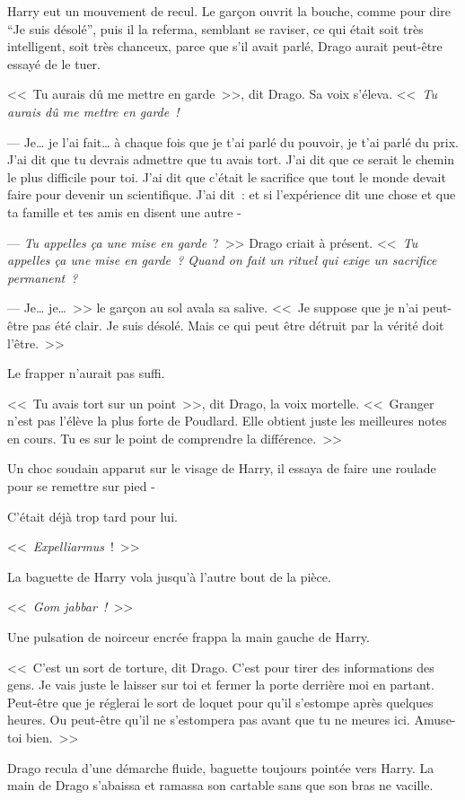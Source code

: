 Harry eut un mouvement de recul. Le garçon ouvrit la bouche, comme pour dire “Je suis désolé”, puis il la referma, semblant se raviser, ce qui était soit très intelligent, soit très chanceux, parce que s'il avait parlé, Drago aurait peut-être essayé de le tuer.

<<~Tu aurais dû me mettre en garde~>>, dit Drago. Sa voix s'éleva. <<~\emph{Tu aurais dû me mettre en garde~!}

--- Je… je l'ai fait… à chaque fois que je t'ai parlé du pouvoir, je t'ai parlé du prix. J'ai dit que tu devrais admettre que tu avais tort. J'ai dit que ce serait le chemin le plus difficile pour toi. J'ai dit que c'était le sacrifice que tout le monde devait faire pour devenir un scientifique. J'ai dit~: et si l'expérience dit une chose et que ta famille et tes amis en disent une autre -

--- \emph{Tu appelles ça une mise en garde}~?~>> Drago criait à présent. <<~\emph{Tu appelles ça une mise en garde~? Quand on fait un rituel qui exige un sacrifice permanent~?}

--- Je… je…~>> le garçon au sol avala sa salive. <<~Je suppose que je n'ai peut-être pas été clair. Je suis désolé. Mais ce qui peut être détruit par la vérité doit l'être.~>>

Le frapper n'aurait pas suffi.

<<~Tu avais tort sur un point~>>, dit Drago, la voix mortelle. <<~Granger n'est pas l'élève la plus forte de Poudlard. Elle obtient juste les meilleures notes en cours. Tu es sur le point de comprendre la différence.~>>

Un choc soudain apparut sur le visage de Harry, il essaya de faire une roulade pour se remettre sur pied -

C'était déjà trop tard pour lui.

<<~\emph{Expelliarmus}~!~>>

La baguette de Harry vola jusqu'à l'autre bout de la pièce.

<<~\emph{Gom jabbar~!}~>>

Une pulsation de noirceur encrée frappa la main gauche de Harry.

<<~C'est un sort de torture, dit Drago. C'est pour tirer des informations des gens. Je vais juste le laisser sur toi et fermer la porte derrière moi en partant. Peut-être que je réglerai le sort de loquet pour qu'il s'estompe après quelques heures. Ou peut-être qu'il ne s'estompera pas avant que tu ne meures ici. Amuse-toi bien.~>>

Drago recula d'une démarche fluide, baguette toujours pointée vers Harry. La main de Drago s'abaissa et ramassa son cartable sans que son bras ne vacille.

